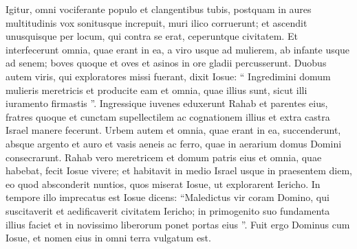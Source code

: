 \begin{biblechapter}
\begin{biblechapter}
\begin{biblechapter}
\begin{biblechapter}
\begin{biblechapter}
\begin{biblechapter}
 \verse Igitur, omni vociferante populo et clangentibus tubis, postquam in aures multitudinis vox sonitusque increpuit, muri ilico corruerunt; et ascendit unusquisque per locum, qui contra se erat, ceperuntque civitatem. 
\verse Et interfecerunt omnia, quae erant in ea, a viro usque ad mulierem, ab infante usque ad senem; boves quoque et oves et asinos in ore gladii percusserunt. 
 \verse Duobus autem viris, qui exploratores missi fuerant, dixit Iosue: “ Ingredimini domum mulieris meretricis et producite eam et omnia, quae illius sunt, sicut illi iuramento firmastis ”. 
\verse Ingressique iuvenes eduxerunt Rahab et parentes eius, fratres quoque et cunctam supellectilem ac cognationem illius et extra castra Israel manere fecerunt.
 \verse Urbem autem et omnia, quae erant in ea, succenderunt, absque argento et auro et vasis aeneis ac ferro, quae in aerarium domus Domini consecrarunt. 
\verse Rahab vero meretricem et domum patris eius et omnia, quae habebat, fecit Iosue vivere; et habitavit in medio Israel usque in praesentem diem, eo quod absconderit nuntios, quos miserat Iosue, ut explorarent Iericho.
 In tempore illo imprecatus est Iosue dicens: 
\verse “Maledictus vir coram Domino, qui suscitaverit et aedificaverit civitatem Iericho; in primogenito suo fundamenta illius faciet et in novissimo liberorum ponet portas eius ”.
 \verse Fuit ergo Dominus cum Iosue, et nomen eius in omni terra vulgatum est.
 

\end{biblechapter}
\end{biblechapter}
\end{biblechapter}
\end{biblechapter}
\end{biblechapter}
\end{biblechapter}
